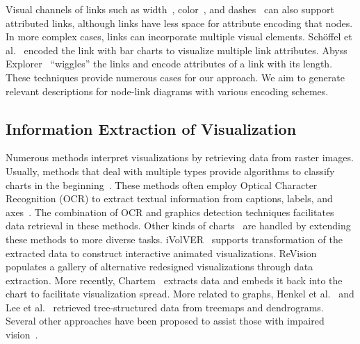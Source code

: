 Visual channels of links such as width~\cite{Katz_2015}, color~\cite{DBLP:journals/tvcg/Guo09}, and dashes~\cite{DBLP:journals/bmcbi/JunkerKS06} can also support attributed links,
although links have less space for attribute encoding that nodes.
In more complex cases, links can incorporate multiple visual elements.
Sch{\"{o}}ffel et al.~\cite{DBLP:conf/iv/SchoffelSE16} encoded the link with bar charts to visualize multiple link attributes.
Abyss Explorer~\cite{DBLP:journals/tvcg/NielsenJBJ09} ``wiggles'' the links and encode attributes of a link with its length.
These techniques provide numerous cases for our approach. 
We aim to generate relevant descriptions for node-link diagrams with various encoding schemes.

\subsection{Information Extraction of Visualization}
Numerous methods interpret visualizations by retrieving data from raster images.
Usually, methods that deal with multiple types provide algorithms to classify charts in the beginning~\cite{DBLP:conf/icip/GaoZB12, DBLP:conf/chi/JungKSHLKS17, DBLP:conf/eccv/SiegelHLDF16, DBLP:journals/vlc/DaiWNZ18}.
These methods often employ Optical Character Recognition (OCR) to extract textual information from captions, labels, and axes~\cite{DBLP:conf/icip/ZhouT00, DBLP:conf/doceng/HuangT07, DBLP:conf/grec/HuangTL03}.
The combination of OCR and graphics detection techniques facilitates data retrieval in these methods.
Other kinds of charts~\cite{DBLP:conf/pkdd/ClicheRMY17, DBLP:conf/uist/SavvaKCFAH11} are handled by extending these methods to more diverse tasks.
iVolVER~\cite{DBLP:conf/chi/MendezNV16} supports transformation of the extracted data to construct interactive animated visualizations.
ReVision~\cite{DBLP:conf/uist/SavvaKCFAH11} populates a gallery of alternative redesigned visualizations through data extraction.
More recently, Chartem~\cite{DBLP:journals/tvcg/FuZCGWZHTZM21} extracts data and embeds it back into the chart to facilitate visualization spread.
More related to graphs, Henkel et al.~\cite{DBLP:conf/vmv/HenkelKLG20} and Lee et al.~\cite{DBLP:conf/icdar/LeeYWH17} retrieved tree-structured data from treemaps and dendrograms.
Several other approaches have been proposed to assist those with impaired vision~\cite{DBLP:conf/ismis/ChesterE05, DBLP:journals/tiis/CarberrySMDWGCSOM12, DBLP:journals/cgf/ChoiJPCE19}.


